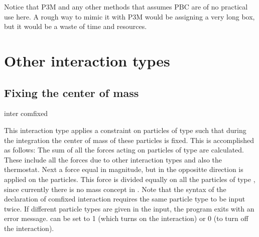 Notice that P3M and any other methods that assumes PBC are of no
practical use here.  A rough way to mimic it with P3M would be
assigning a very long box, but it would be a waste of time and
resources.

\section{Other interaction types}
\label{sec:inter-other}

\subsection{Fixing the center of mass}
\begin{essyntax}
  inter   comfixed 
  \begin{features}
  \end{features}
\end{essyntax}
This interaction type applies a constraint on particles of type
 such that during the integration the center of mass of
these particles is fixed. This is accomplished as follows: The sum of
all the forces acting on particles of type  are
calculated. These include all the forces due to other interaction
types and also the thermostat. Next a force equal in magnitude, but in
the oppositte direction is applied on the particles. This force is
divided equally on all the particles of type , since
currently there is no mass concept in \es. Note that the syntax of the
declaration of comfixed interaction requires the same particle type to
be input twice. If different particle types are given in the input,
the program exits with an error message.  can be set to 1
(which turns on the interaction) or 0 (to turn off the interaction).

